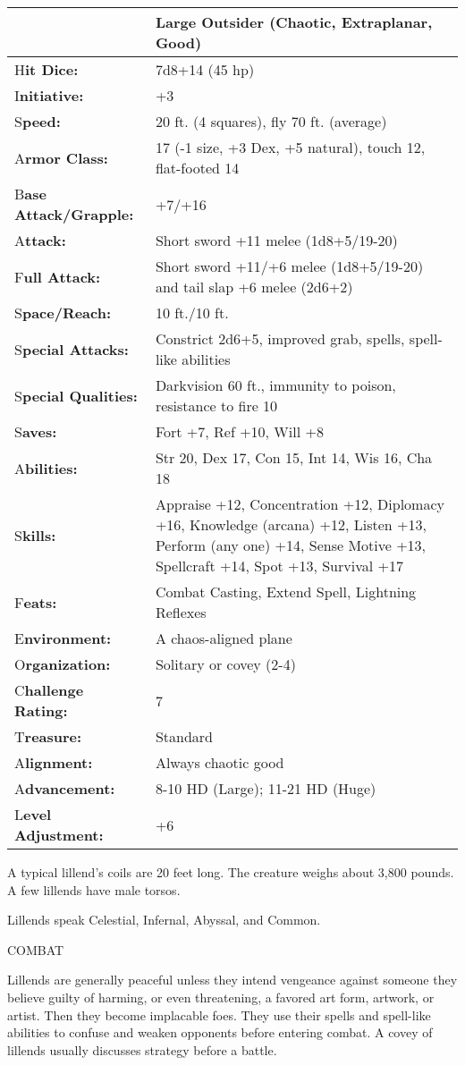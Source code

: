\documentclass{article}
\begin{document}
\begin{tabular}{|>{\raggedright}p{87pt}|>{\raggedright}p{238pt}|}
\hline
  & Large Outsider (Chaotic, Extraplanar, Good)\tabularnewline
\hline
H\textbf{it Dice:} & 7d8+14 (45 hp)\tabularnewline
\hline
I\textbf{nitiative:} & +3\tabularnewline
\hline
S\textbf{peed:} & 20 ft. (4 squares), fly 70 ft. (average)\tabularnewline
\hline
A\textbf{rmor Class:} & 17 (-1 size, +3 Dex, +5 natural), touch 12, flat-footed 
14\tabularnewline
\hline
B\textbf{ase Attack/Grapple:} & +7/+16\tabularnewline
\hline
A\textbf{ttack:} & Short sword +11 melee (1d8+5/19-20)\tabularnewline
\hline
F\textbf{ull Attack:} & Short sword +11/+6 melee (1d8+5/19-20) and tail slap +6 
melee (2d6+2)\tabularnewline
\hline
S\textbf{pace/Reach:} & 10 ft./10 ft.\tabularnewline
\hline
S\textbf{pecial Attacks:} & Constrict 2d6+5, improved grab, spells, spell-like 
abilities\tabularnewline
\hline
S\textbf{pecial Qualities:} & Darkvision 60 ft., immunity to poison, resistance 
to fire 10\tabularnewline
\hline
S\textbf{aves:} & Fort +7, Ref +10, Will +8\tabularnewline
\hline
A\textbf{bilities:} & Str 20, Dex 17, Con 15, Int 14, Wis 16, Cha 18\tabularnewline
\hline
S\textbf{kills:} & Appraise +12, Concentration +12, Diplomacy +16, Knowledge (arcana) 
+12, Listen +13, Perform (any one) +14, Sense Motive +13, Spellcraft +14, Spot 
+13, Survival +17\tabularnewline
\hline
F\textbf{eats:} & Combat Casting, Extend Spell, Lightning Reflexes\tabularnewline
\hline
E\textbf{nvironment:} & A chaos-aligned plane\tabularnewline
\hline
O\textbf{rganization:} & Solitary or covey (2-4)\tabularnewline
\hline
C\textbf{hallenge Rating:} & 7\tabularnewline
\hline
T\textbf{reasure:} & Standard\tabularnewline
\hline
A\textbf{lignment:} & Always chaotic good\tabularnewline
\hline
A\textbf{dvancement:} & 8-10 HD (Large); 11-21 HD (Huge)\tabularnewline
\hline
L\textbf{evel Adjustment:} & +6\tabularnewline
\hline
\end{tabular}

A typical lillend's coils are 20 feet long. The creature weighs about 3,800 pounds. 
A few lillends have male torsos.

Lillends speak Celestial, Infernal, Abyssal, and Common.

COMBAT

Lillends are generally peaceful unless they intend vengeance against someone they 
believe guilty of harming, or even threatening, a favored art form, artwork, or 
artist. Then they become implacable foes. They use their spells and spell-like 
abilities to confuse and weaken opponents before entering combat. A covey of lillends 
usually discusses strategy before a battle.
\end{document}
